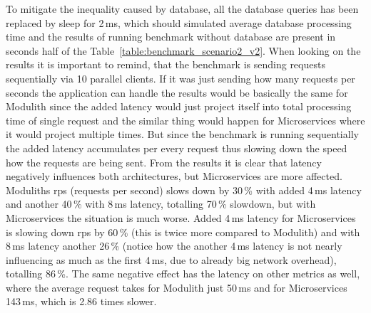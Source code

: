 To mitigate the inequality caused by database, all the database queries has been replaced by sleep for 2\,ms, which should simulated average database processing time and the results of running benchmark without database are present in seconds half of the Table~\ref{table:benchmark_scenario2_v2}. When looking on the results it is important to remind, that the benchmark is sending requests sequentially via 10 parallel clients. If it was just sending how many requests per seconds the application can handle the results would be basically the same for Modulith since the added latency would just project itself into total processing time of single request and the similar thing would happen for Microservices where it would project multiple times. But since the benchmark is running sequentially the added latency accumulates per every request thus slowing down the speed how the requests are being sent. From the results it is clear that latency negatively influences both architectures, but Microservices are more affected. Moduliths rps (requests per second) slows down by 30\,\% with added 4\,ms latency and another 40\,\% with 8\,ms latency, totalling 70\,\% slowdown, but with Microservices the situation is much worse. Added 4\,ms latency for Microservices is slowing down rps by 60\,\% (this is twice more compared to Modulith) and with 8\,ms latency another 26\,\% (notice how the another 4\,ms latency is not nearly influencing as much as the first 4\,ms, due to already big network overhead), totalling 86\,\%. The same negative effect has the latency on other metrics as well, where the average request takes for Modulith just 50\,ms and for Microservices 143\,ms, which is 2.86 times slower.



